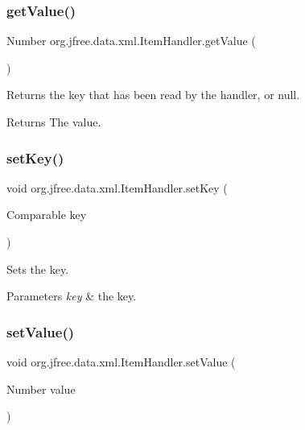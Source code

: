 \subsubsection{\texorpdfstring{get\+Value()}{getValue()}}
{\footnotesize\ttfamily Number org.\+jfree.\+data.\+xml.\+Item\+Handler.\+get\+Value (\begin{DoxyParamCaption}{ }\end{DoxyParamCaption})}

Returns the key that has been read by the handler, or {\ttfamily null}.

\begin{DoxyReturn}{Returns}
The value. 
\end{DoxyReturn}
\mbox{\label{classorg_1_1jfree_1_1data_1_1xml_1_1_item_handler_ac7cd00aeccc0427628f684c029b1012d}} 
\subsubsection{\texorpdfstring{set\+Key()}{setKey()}}
{\footnotesize\ttfamily void org.\+jfree.\+data.\+xml.\+Item\+Handler.\+set\+Key (\begin{DoxyParamCaption}\item[{Comparable}]{key }\end{DoxyParamCaption})}

Sets the key.


\begin{DoxyParams}{Parameters}
{\em key} & the key. \\
\hline
\end{DoxyParams}
\mbox{\label{classorg_1_1jfree_1_1data_1_1xml_1_1_item_handler_a860aeb1aaaa02ffa563f633197df2595}} 
\subsubsection{\texorpdfstring{set\+Value()}{setValue()}}
{\footnotesize\ttfamily void org.\+jfree.\+data.\+xml.\+Item\+Handler.\+set\+Value (\begin{DoxyParamCaption}\item[{Number}]{value }\end{DoxyParamCaption})}

